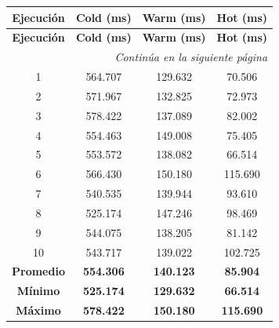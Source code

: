 \begin{longtable}{@{}cccc@{}}

\toprule
\textbf{Ejecución} &
\textbf{Cold (ms)} &
\textbf{Warm (ms)} &
\textbf{Hot (ms)} \\
\toprule
\endfirsthead

\toprule
\textbf{Ejecución} &
\textbf{Cold (ms)} &
\textbf{Warm (ms)} &
\textbf{Hot (ms)} \\
\toprule
\endhead

\midrule[\heavyrulewidth]
\multicolumn{4}{r}{\textit{Continúa en la siguiente página}}\\
\endfoot

\bottomrule
\endlastfoot

1  & 564.707 & 129.632 & 70.506 \\
2  & 571.967 & 132.825 & 72.973 \\
3  & 578.422 & 137.089 & 82.002 \\
4  & 554.463 & 149.008 & 75.405 \\
5  & 553.572 & 138.082 & 66.514 \\
6  & 566.430 & 150.180 & 115.690 \\
7  & 540.535 & 139.944 & 93.610 \\
8  & 525.174 & 147.246 & 98.469 \\
9  & 544.075 & 138.205 & 81.142 \\
10 & 543.717 & 139.022 & 102.725 \\

\midrule

\textbf{Promedio} & \textbf{554.306} & \textbf{140.123} & \textbf{85.904} \\
\textbf{Mínimo}   & \textbf{525.174} & \textbf{129.632} & \textbf{66.514} \\
\textbf{Máximo}   & \textbf{578.422} & \textbf{150.180} & \textbf{115.690} \\

\end{longtable}